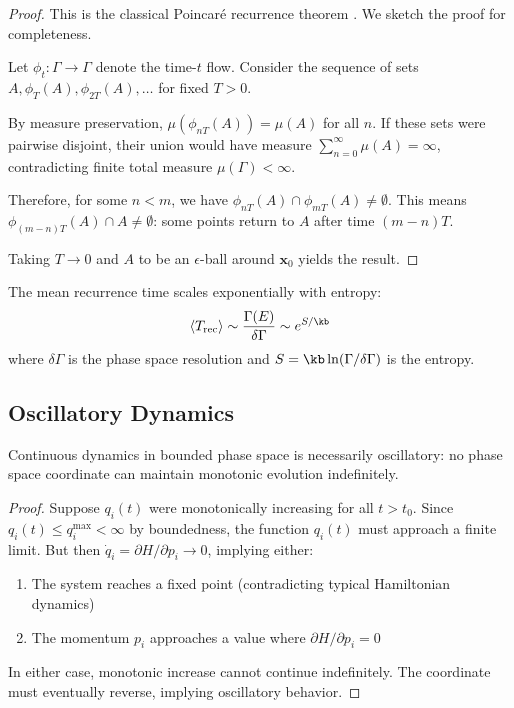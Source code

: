 \begin{proof}
This is the classical Poincar\'{e} recurrence theorem \cite{poincare1890}. We sketch the proof for completeness.

Let $\phi_t: \Gamma \to \Gamma$ denote the time-$t$ flow. Consider the sequence of sets $A, \phi_T(A), \phi_{2T}(A), \ldots$ for fixed $T > 0$.

By measure preservation, $\mu(\phi_{nT}(A)) = \mu(A)$ for all $n$. If these sets were pairwise disjoint, their union would have measure $\sum_{n=0}^{\infty} \mu(A) = \infty$, contradicting finite total measure $\mu(\Gamma) < \infty$.

Therefore, for some $n < m$, we have $\phi_{nT}(A) \cap \phi_{mT}(A) \neq \emptyset$. This means $\phi_{(m-n)T}(A) \cap A \neq \emptyset$: some points return to $A$ after time $(m-n)T$.

Taking $T \to 0$ and $A$ to be an $\epsilon$-ball around $\mathbf{x}_0$ yields the result.
\end{proof}

\begin{corollary}
The mean recurrence time scales exponentially with entropy:
\begin{equation}
\langle T_{\text{rec}} \rangle \sim \frac{\Gamma(E)}{\delta\Gamma} \sim e^{S/\kb}
\label{eq:recurrence_time}
\end{equation}
where $\delta\Gamma$ is the phase space resolution and $S = \kb \ln(\Gamma/\delta\Gamma)$ is the entropy.
\end{corollary}

\subsection{Oscillatory Dynamics}

\begin{proposition}
\label{prop:oscillatory}
Continuous dynamics in bounded phase space is necessarily oscillatory: no phase space coordinate can maintain monotonic evolution indefinitely.
\end{proposition}

\begin{proof}
Suppose $q_i(t)$ were monotonically increasing for all $t > t_0$. Since $q_i(t) \leq q_i^{\max} < \infty$ by boundedness, the function $q_i(t)$ must approach a finite limit. But then $\dot{q}_i = \partial H/\partial p_i \to 0$, implying either:
\begin{enumerate}
    \item The system reaches a fixed point (contradicting typical Hamiltonian dynamics)
    \item The momentum $p_i$ approaches a value where $\partial H/\partial p_i = 0$
\end{enumerate}

In either case, monotonic increase cannot continue indefinitely. The coordinate must eventually reverse, implying oscillatory behavior.
\end{proof}

